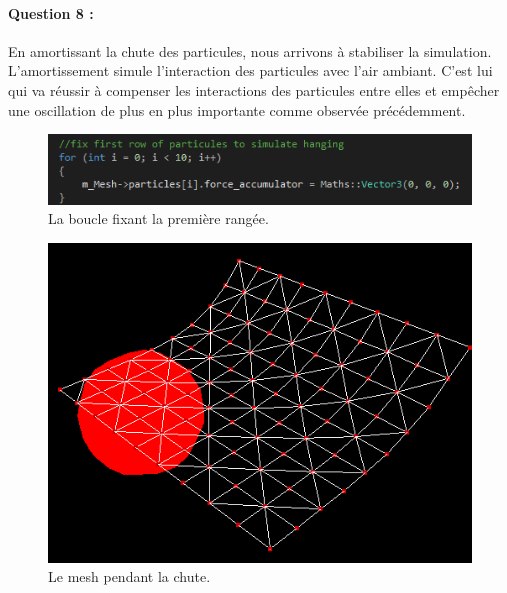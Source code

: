 \documentclass[a4paper,12pt]{article}
\begin{document}
\paragraph{Question 8 :} En amortissant la chute des particules, nous arrivons à stabiliser la simulation. L'amortissement simule l'interaction des particules avec l'air ambiant. C'est lui qui va réussir à compenser les interactions des particules entre elles et empêcher une oscillation de plus en plus importante comme observée précédemment. 
\begin{figure}[ht!]
  \centering
  \includegraphics{images/rideau_code.png}
  \caption{La boucle fixant la première rangée.}
  \label{fig:rideauCode}
\end{figure}
\begin{figure}[ht!]
  \centering
  \includegraphics{images/rideau_chute.png}
  \caption{Le mesh pendant la chute.}
  \label{fig:rideauFall}
\end{figure}
\end{document}
